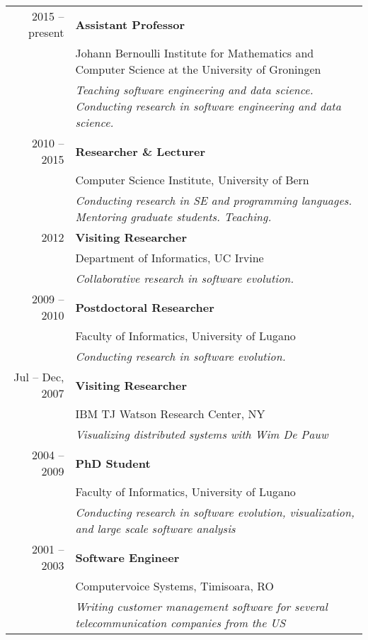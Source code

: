 \newcommand{\job}[4]{#1 & {\bf #3}\\ & #2\\  &{\small \em#4} \vspace{0.5em} \\}



\begin{tabular}{r p{8cm}}

	\job
	{2015 -- present}
	{Johann Bernoulli Institute for Mathematics and Computer Science at the University of Groningen}
	{Assistant Professor}
	{Teaching software engineering and data science. Conducting research in software engineering and data science.}

	\job
	{2010 -- 2015}
	{Computer Science Institute, University of Bern}
	{Researcher \& Lecturer}
	{
	Conducting research in SE and programming languages. Mentoring graduate students. Teaching.}

	\job
	{2012}
	{Department of Informatics, UC Irvine}
	{Visiting Researcher}
	{Collaborative research in software evolution. 
	}


	\job
	{2009 -- 2010}
	{Faculty of Informatics, University of Lugano}
	{Postdoctoral Researcher}
	{Conducting research in software evolution. }

	\job 
	{Jul -- Dec, 2007}
	{IBM TJ Watson Research Center, NY}
	{Visiting Researcher}
	{Visualizing distributed systems with Wim De Pauw}


	\job 
	{2004 -- 2009}
	{Faculty of Informatics, University of Lugano}
	{PhD Student}
	{Conducting research in software evolution, visualization, and large scale software analysis}


	\job
	{2001 -- 2003}
	{Computervoice Systems, Timisoara, RO}
	{Software Engineer}
	{Writing customer management software for several telecommunication companies from the US}


\end{tabular}

